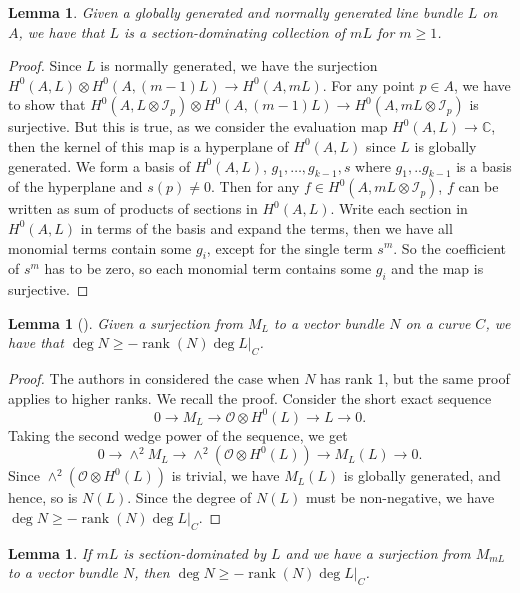 \documentclass{amsart}
\newtheorem{lemma}[theorem]{Lemma}
\theoremstyle{definition}
\theoremstyle{remark}
\begin{document}
\begin{lemma}\label{section}
Given a globally generated and normally generated line bundle $L$ on $A$, we have that $L$ is a section-dominating collection of $mL$ for $m\geq 1$.
\end{lemma}
\begin{proof}
Since $L$ is normally generated, we have the surjection $H^0(A,L) \otimes H^0(A,(m-1)L) 
\to H^0(A,mL)$. For any point $p\in A$, we have to show that $H^0(A,L\otimes \mathcal{I}_p) \otimes H^0(A,(m-1)L) 
\to H^0(A,mL\otimes \mathcal{I}_p)$ is surjective. But this is true, as we consider the evaluation map $H^0(A, L)\to \mathbb{C}$, then the kernel of this map is a hyperplane of $H^0(A, L)$ since $L$ is globally generated. We form a basis of $H^0(A,L)$, $g_1,\dots,g_{k-1},s$ where $g_1,..g_{k-1}$ is a basis of the hyperplane and $s(p)\neq 0$. Then for any $f \in H^0(A,mL\otimes \mathcal{I}_p)$, $f$ can be written as sum of products of sections in $H^0(A,L)$. Write each section in $H^0(A,L)$ in terms of the basis and expand the terms, then we have all monomial terms contain some $g_i$, except for the single term $s^m$. So the coefficient of $s^m$ has to be zero, so each monomial term contains some $g_i$ and the map is surjective.
\end{proof}


\begin{lemma}[{\cite[Proposition~2.7]{coskun2019algebraichyperbolicitygeneralsurfaces}}]\label{lem2}
Given a surjection from $M_L$ to a vector bundle $N$ on a curve $C$, we have that $\deg N \geq -\operatorname{rank}(N)\deg L|_C$.
\end{lemma}

\begin{proof}
The authors in \cite{coskun2019algebraichyperbolicitygeneralsurfaces} considered the case when $N$ has rank 1, but the same proof applies to higher ranks. We recall the proof. Consider the short exact sequence
\[
0 \to M_L \to \mathcal{O} \otimes H^0(L) \to L \to 0.
\]
Taking the second wedge power of the sequence, we get
\[
0 \to \wedge^2 M_L \to \wedge^2(\mathcal{O} \otimes H^0(L)) \to M_L(L) \to 0.
\]
Since $\wedge^2(\mathcal{O} \otimes H^0(L))$ is trivial, we have $M_L(L)$ is globally generated, and hence, so is $N(L)$. Since the degree of $N(L)$ must be non-negative, we have $\deg N \geq -\operatorname{rank}(N)\deg L|_C$.
\end{proof}


\begin{lemma}\label{lemma}
If $mL$ is section-dominated by $L$ and we have a surjection from $M_{mL}$ to a vector bundle $N$, then $\deg N \geq -\operatorname{rank}(N)\deg L|_C$.
\end{lemma}
\end{document}
